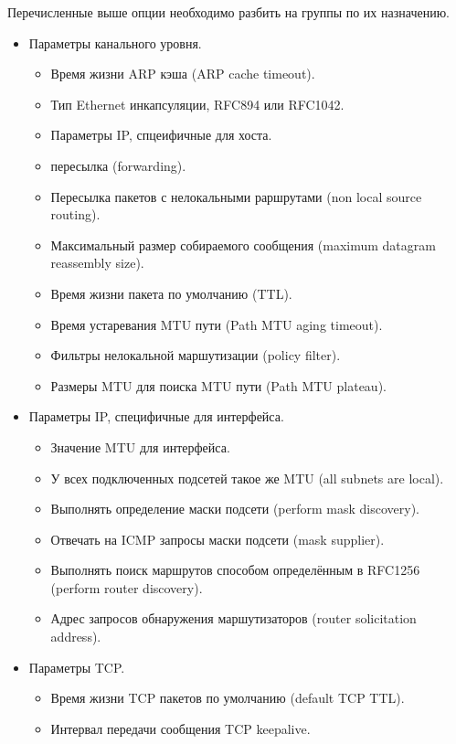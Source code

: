 \documentclass[14pt,a4paper]{extarticle}
\begin{document}
Перечисленные выше опции необходимо разбить на группы по их назначению.

\begin{itemize}
    \item Параметры канального уровня.
    \begin{itemize}
        \item Время жизни ARP кэша (ARP cache timeout).
        \item Тип Ethernet инкапсуляции, RFC894 или RFC1042.
        \item Параметры IP, спцеифичные для хоста.
        \item пересылка (forwarding).
        \item Пересылка пакетов с нелокальными раршрутами (non local source routing).
        \item Максимальный размер собираемого сообщения (maximum datagram reassembly size).
        \item Время жизни пакета по умолчанию (TTL).
        \item Время устаревания MTU пути (Path MTU aging timeout).
        \item Фильтры нелокальной маршутизации (policy filter).
        \item Размеры MTU для поиска MTU пути (Path MTU plateau).
    \end{itemize}
    \item Параметры IP, специфичные для интерфейса.
    \begin{itemize}
        \item Значение MTU для интерфейса.
        \item У всех подключенных подсетей такое же MTU (all subnets are local).
        \item Выполнять определение маски подсети (perform mask discovery).
        \item Отвечать на ICMP запросы маски подсети (mask supplier).
        \item Выполнять поиск маршрутов способом определённым в RFC1256 (perform router discovery).
        \item Адрес запросов обнаружения маршутизаторов (router solicitation address).
    \end{itemize}
    \item Параметры TCP.
    \begin{itemize}
        \item Время жизни TCP пакетов по умолчанию (default TCP TTL).
        \item Интервал передачи сообщения TCP keepalive.

\end{itemize}
\end{itemize}
\end{document}
